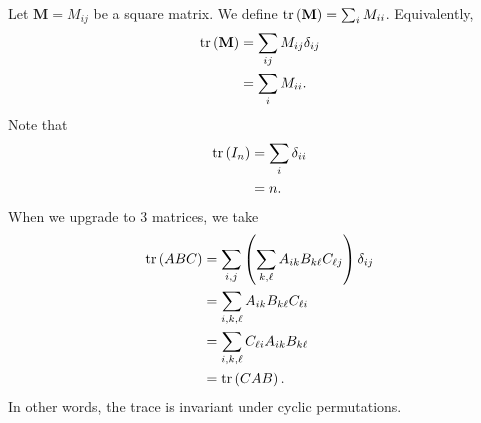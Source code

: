 \documentclass[10pt]{mypackage}
\begin{document}
\begin{example}[Trace]
  Let $\mathbf{M} = M_{ij}$ be a square matrix. We define $\tr\left(\mathbf{M}\right) = \sum_{i}M_{ii}$. Equivalently,
  \begin{align*}
    \tr\left(\mathbf{M}\right) &= \sum_{ij}M_{ij}\delta_{ij}\\
                                     &= \sum_{i}M_{ii}.
  \end{align*}
  Note that
  \begin{align*}
    \tr\left(I_{n}\right) &= \sum_{i}\delta_{ii}\\
                                     &= n.
  \end{align*}
  When we upgrade to $3$ matrices, we take
  \begin{align*}
    \tr\left(ABC\right) &= \sum_{i,j}\left(\sum_{k,\ell}A_{ik}B_{k\ell}C_{\ell j}\right)\delta_{ij}\\
                        &= \sum_{i,k,\ell}A_{ik}B_{k\ell}C_{\ell i}\\
                        &= \sum_{i,k,\ell}C_{\ell i}A_{ik}B_{k\ell}\\
                        &= \tr\left(CAB\right).
  \end{align*}
  In other words, the trace is invariant under cyclic permutations.
\end{example}
\end{document}
